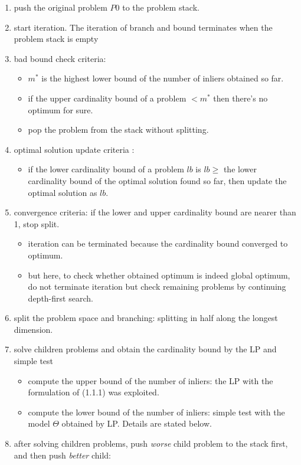 \documentclass[paper=a4, fontsize=11pt]{scrartcl} %
\numberwithin{equation}{section} %
\numberwithin{figure}{section} %
\numberwithin{table}{section} %
\begin{document}
\begin{enumerate}
\item push the original problem $P0$ to the problem stack.
\item start iteration. The iteration of branch and bound terminates when the problem stack is empty
\item bad bound check criteria: 
	\begin{itemize}
	\item $m^*$ is the highest lower bound of the number of inliers obtained so far.
	\item if the upper cardinality bound of a problem $< m^*$ then there's no optimum for sure.
	\item pop the problem from the stack without splitting.
	\end{itemize}
\item optimal solution update criteria :
	\begin{itemize}
	\item if the lower cardinality bound of a problem $lb$ is $lb \geq$ the lower cardinality bound of the optimal solution found so far, then update the optimal solution as $lb$.  
	\end{itemize}
\item convergence criteria: if the lower and upper cardinality bound are nearer than 1, stop split. 
	\begin{itemize}
	\item iteration can be terminated because the cardinality bound converged to optimum. 
	\item but here, to check whether obtained optimum is indeed global optimum, do not terminate iteration but check remaining problems by continuing depth-first search. 
	\end{itemize}
\item split the problem space and branching: splitting in half along the longest dimension. 
\item solve children problems and obtain the cardinality bound by the LP and simple test
	\begin{itemize}
	\item compute the upper bound of the number of inliers: the LP with the formulation of (1.1.1) was exploited.
	\item compute the lower bound of the number of inliers: simple test with the model $\Theta$ obtained by LP. Details are stated below.
	\end{itemize}
\item after solving children problems, push \textit{worse} child problem to the stack first, and then push \textit{better} child:

\end{enumerate}
\end{document}
